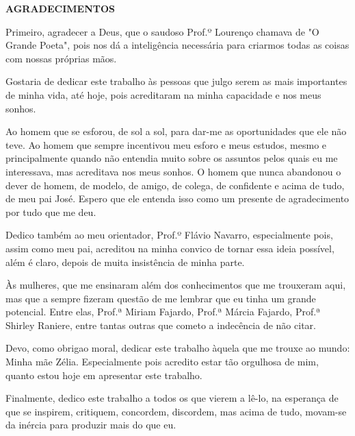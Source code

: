 \begin{center}
\textbf{AGRADECIMENTOS}
\end{center}

Primeiro, agradecer a Deus, que o saudoso Prof.º Lourenço chamava de "O Grande Poeta", pois nos d\'a a intelig\^encia necess\'aria para criarmos todas as coisas com nossas pr\'oprias m\~aos.

Gostaria de dedicar este trabalho \`as pessoas que julgo serem as mais importantes de minha vida, at\'e hoje, pois acreditaram na minha capacidade e nos meus sonhos.

Ao homem que se esfor\cc ou, de sol a sol, para dar-me as oportunidades que ele n\~ao teve. Ao homem que sempre incentivou meu esfor\cc o e meus estudos, mesmo e principalmente quando n\~ao entendia muito sobre os assuntos pelos quais eu me interessava, mas acreditava nos meus sonhos. O homem que nunca abandonou o dever de homem, de modelo, de amigo, de colega, de confidente e acima de tudo, de meu pai Jos\'e. Espero que ele entenda isso como um presente de agradecimento por tudo que me deu.

Dedico tamb\'em ao meu orientador, Prof.º Fl\'avio Navarro, especialmente pois, assim como meu pai, acreditou na minha convic\ca o de tornar essa ideia poss\'ivel, al\'em \'e claro, depois de muita insist\^encia de minha parte.

 \`{A}s mulheres, que me ensinaram al\'em dos conhecimentos que me trouxeram aqui, mas que a
sempre fizeram quest\~ao de me lembrar que eu tinha um grande potencial. Entre elas, Prof.ª Miriam Fajardo, Prof.ª M\'arcia Fajardo, Prof.ª Shirley Raniere, entre tantas outras que cometo a indec\^encia de n\~ao citar.

Devo, como obriga\ca o moral, dedicar este trabalho \`aquela que me trouxe ao mundo: Minha m\~ae Z\'elia. Especialmente pois acredito estar t\~ao orgulhosa de mim, quanto estou hoje em apresentar este trabalho.

Finalmente, dedico este trabalho a todos os que vierem a l\^e-lo, na esperança de que se inspirem, critiquem, concordem, discordem, mas acima de tudo, movam-se da in\'ercia para produzir mais do que eu.
